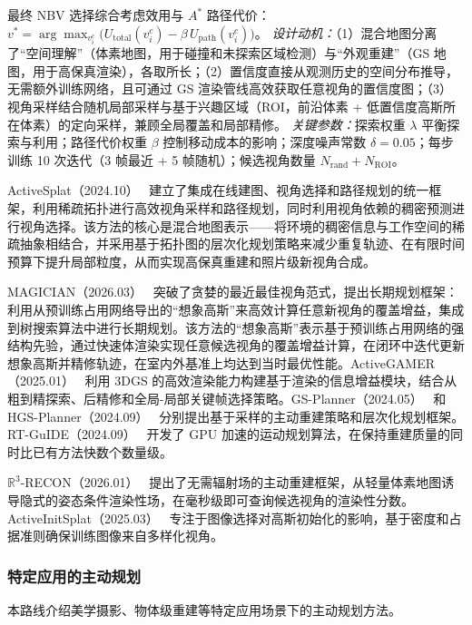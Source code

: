 最终 NBV 选择综合考虑效用与 $A^*$ 路径代价：$v^* = \arg\max_{v_i^c}\bigl(U_{\mathrm{total}}(v_i^c) - \beta\,U_{\mathrm{path}}(v_i^c)\bigr)$。
\emph{设计动机：}（1）混合地图分离了``空间理解''（体素地图，用于碰撞和未探索区域检测）与``外观重建''（GS 地图，用于高保真渲染），各取所长；（2）置信度直接从观测历史的空间分布推导，无需额外训练网络，且可通过 GS 渲染管线高效获取任意视角的置信度图；（3）视角采样结合随机局部采样与基于兴趣区域（ROI，前沿体素 + 低置信度高斯所在体素）的定向采样，兼顾全局覆盖和局部精修。
\emph{关键参数：}探索权重 $\lambda$ 平衡探索与利用；路径代价权重 $\beta$ 控制移动成本的影响；深度噪声常数 $\delta=0.05$；每步训练 10 次迭代（3 帧最近 + 5 帧随机）；候选视角数量 $N_{\mathrm{rand}} + N_{\mathrm{ROI}}$。

ActiveSplat（2024.10）~\cite{2410_21955} 建立了集成在线建图、视角选择和路径规划的统一框架，利用稀疏拓扑进行高效视角采样和路径规划，同时利用视角依赖的稠密预测进行视角选择。该方法的核心是混合地图表示——将环境的稠密信息与工作空间的稀疏抽象相结合，并采用基于拓扑图的层次化规划策略来减少重复轨迹、在有限时间预算下提升局部粒度，从而实现高保真重建和照片级新视角合成。

MAGICIAN（2026.03）~\cite{2603_22650} 突破了贪婪的最近最佳视角范式，提出长期规划框架：利用从预训练占用网络导出的``想象高斯''来高效计算任意新视角的覆盖增益，集成到树搜索算法中进行长期规划。该方法的``想象高斯''表示基于预训练占用网络的强结构先验，通过快速体渲染实现任意候选视角的覆盖增益计算，在闭环中迭代更新想象高斯并精修轨迹，在室内外基准上均达到当时最优性能。ActiveGAMER（2025.01）~\cite{2501_06897} 利用 3DGS 的高效渲染能力构建基于渲染的信息增益模块，结合从粗到精探索、后精修和全局-局部关键帧选择策略。GS-Planner（2024.05）~\cite{2405_10142} 和 HGS-Planner（2024.09）~\cite{2409_17624} 分别提出基于采样的主动重建策略和层次化规划框架。RT-GuIDE（2024.09）~\cite{2409_18122} 开发了 GPU 加速的运动规划算法，在保持重建质量的同时比已有方法快数个数量级。

$\mathbb{R}^3$-RECON（2026.01）~\cite{2601_07484} 提出了无需辐射场的主动重建框架，从轻量体素地图诱导隐式的姿态条件渲染性场，在毫秒级即可查询候选视角的渲染性分数。ActiveInitSplat（2025.03）~\cite{2503_06859} 专注于图像选择对高斯初始化的影响，基于密度和占据准则确保训练图像来自多样化视角。

\subsubsection{特定应用的主动规划}

本路线介绍美学摄影、物体级重建等特定应用场景下的主动规划方法。

